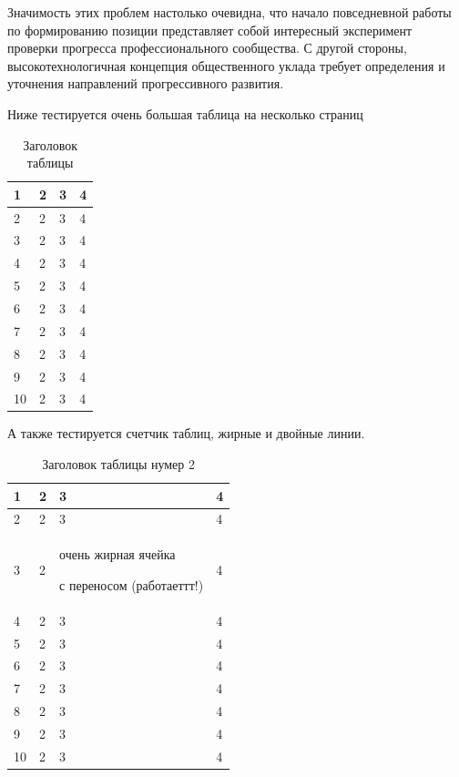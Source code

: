 \documentclass[a4paper,article,14pt]{extarticle}
\begin{document}
Значимость этих проблем настолько очевидна, что начало повседневной работы по формированию позиции представляет собой интересный эксперимент проверки прогресса профессионального сообщества. С другой стороны, высокотехнологичная концепция общественного уклада требует определения и уточнения направлений прогрессивного развития.


Ниже тестируется очень большая таблица на несколько страниц

\begin{center}
    \begin{longtable}{|p{2cm}|p{3cm}|p{7cm}|p{3cm}|}
    \caption{Заголовок таблицы}\\
    \hline
    1 & 2 & 3 & 4\\
    \hline
    2 & 2 & 3 & 4\\
    \hline
    3 & 2 & 3 & 4\\
    \hline
    4 & 2 & 3 & 4\\
    \hline
    5 & 2 & 3 & 4\\
    \hline
    6 & 2 & 3 & 4\\
    \hline
    7 & 2 & 3 & 4\\
    \hline
    8 & 2 & 3 & 4\\
    \hline
    9 & 2 & 3 & 4\\
    \hline
    10 & 2 & 3 & 4\\
    \hline


    \end{longtable}
\end{center}


А также тестируется счетчик таблиц, жирные и двойные линии.

\begin{center}
    \begin{longtable}{|p{2cm}||p{3cm}|p{7cm}|p{3cm}|}
    \caption{Заголовок таблицы нумер 2}\\
    \hline
    1 & 2 & 3 & 4\\
    \hline
    2 & 2 & 3 & 4\\
    \hline
    3 & 2 & очень жирная ячейка \par с переносом (работаеттт!) & 4\\
    \hline
    4 & 2 & 3 & 4\\
    \hline
    5 & 2 & 3 & 4\\
    \hline
    6 & 2 & 3 & 4\\
    \hline
    7 & 2 & 3 & 4\\
    \hline
    8 & 2 & 3 & 4\\
    \hline
    9 & 2 & 3 & 4\\
    \hline
    10 & 2 & 3 & 4\\
    \hline


    \end{longtable}
\end{center}
\end{document}
